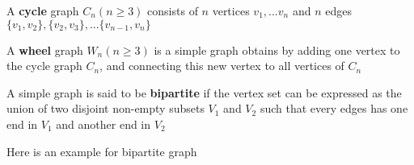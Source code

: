                     \begin{definition}
                        A \textbf{cycle} graph $C_n (n \ge 3)$ consists of $n$ vertices $v_1, ... v_n$ and $n$ edges $\{v_1, v_2\}, \{v_2, v_3\}, ... \{v_{n-1}, v_n\}$
                    \end{definition}

                    \begin{definition}
                        A \textbf{wheel} graph $W_n (n \ge 3)$ is a simple graph obtains by adding one vertex to the cycle graph $C_n$, and connecting this new vertex to all vertices of $C_n$ 
                    \end{definition}

                    \begin{definition}
                        A simple graph is said to be \textbf{bipartite} if the vertex set can be expressed as the union of two disjoint non-empty subsets $V_1$ and $V_2$ such that every edges has one end in $V_1$ and another end in $V_2$
                    \end{definition}

                    \begin{example}
                        Here is an example for bipartite graph
                        \begin{figure}[H]
                            \centering
                        \end{figure}
                    \end{example}

